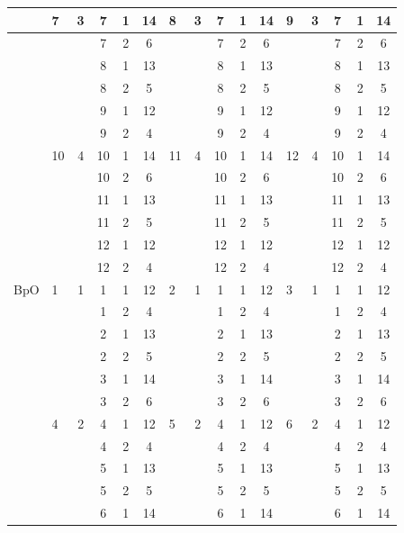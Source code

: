 \documentclass{cmspaper}
\begin{document}
\begin{table}[htb]
\begin{center}
\begin{tabular}{l|l|cccc|l|cccc|l|cccc}
    & 7 & 3 & 7 & 1 & 14 & 8  & 3 & 7 & 1& 14 & 9 & 3 & 7 & 1& 14 \\ \hline
    &   &   & 7 & 2 &  6 &    &   & 7 & 2&  6 &   &   & 7 & 2&  6 \\ \hline
    &   &   & 8 & 1 & 13 &    &   & 8 & 1& 13 &   &   & 8 & 1& 13 \\ \hline
    &   &   & 8 & 2 &  5 &    &   & 8 & 2&  5 &   &   & 8 & 2&  5 \\ \hline
    &   &   & 9 & 1 & 12 &    &   & 9 & 1& 12 &   &   & 9 & 1& 12 \\ \hline
    &   &   & 9 & 2 &  4 &    &   & 9 & 2&  4 &   &   & 9 & 2&  4 \\ \hline
    & 10& 4 & 10 & 1 & 14 & 11& 4 & 10& 1& 14 & 12& 4 & 10 & 1& 14 \\ \hline
    &   &   & 10 & 2 &  6 &    &   & 10 & 2&  6 &   &   & 10 & 2&  6 \\ \hline
    &   &   & 11 & 1 & 13 &    &   & 11 & 1& 13 &   &   & 11 & 1& 13 \\ \hline
    &   &   & 11 & 2 &  5 &    &   & 11 & 2&  5 &   &   & 11 & 2&  5 \\ \hline
    &   &   & 12 & 1 & 12 &    &   & 12 & 1& 12 &   &   & 12 & 1& 12 \\ \hline
    &   &   & 12 & 2 &  4 &    &   & 12 & 2&  4 &   &   & 12 & 2&  4 \\ \hline
\hline
BpO & 1 & 1 & 1 & 1 & 12 & 2  & 1 & 1 & 1& 12 & 3 & 1 & 1 & 1& 12 \\ \hline
    &   &   & 1 & 2 &  4 &    &   & 1 & 2&  4 &   &   & 1 & 2&  4 \\ \hline
    &   &   & 2 & 1 & 13 &    &   & 2 & 1& 13 &   &   & 2 & 1& 13 \\ \hline
    &   &   & 2 & 2 &  5 &    &   & 2 & 2&  5 &   &   & 2 & 2&  5 \\ \hline
    &   &   & 3 & 1 & 14 &    &   & 3 & 1& 14 &   &   & 3 & 1& 14 \\ \hline
    &   &   & 3 & 2 &  6 &    &   & 3 & 2&  6 &   &   & 3 & 2&  6 \\ \hline
    & 4 & 2 & 4 & 1 & 12 & 5  & 2 & 4 & 1& 12 & 6 & 2 & 4 & 1& 12 \\ \hline
    &   &   & 4 & 2 &  4 &    &   & 4 & 2&  4 &   &   & 4 & 2&  4 \\ \hline
    &   &   & 5 & 1 & 13 &    &   & 5 & 1& 13 &   &   & 5 & 1& 13 \\ \hline
    &   &   & 5 & 2 &  5 &    &   & 5 & 2&  5 &   &   & 5 & 2&  5 \\ \hline
    &   &   & 6 & 1 & 14 &    &   & 6 & 1& 14 &   &   & 6 & 1& 14 \\ \hline

\end{tabular}
\end{center}
\end{table}
\end{document}
